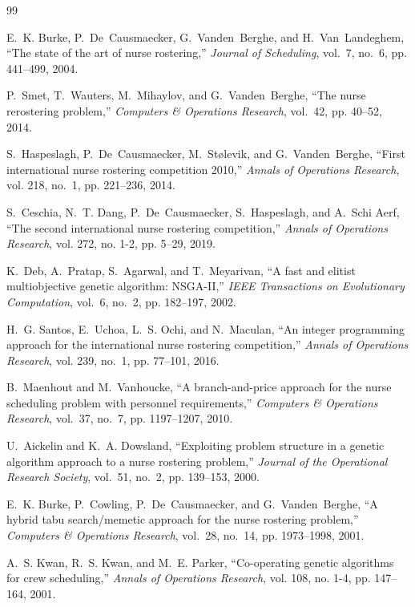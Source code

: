 \documentclass[10pt,journal,compsoc]{IEEEtran}
\begin{document}

\begin{thebibliography}{99}

E.~K. Burke, P.~De~Causmaecker, G.~Vanden~Berghe, and H.~Van~Landeghem, ``The state of the art of nurse rostering,'' \emph{Journal of Scheduling}, vol.~7, no.~6, pp. 441--499, 2004.

P.~Smet, T.~Wauters, M.~Mihaylov, and G.~Vanden~Berghe, ``The nurse rerostering problem,'' \emph{Computers \& Operations Research}, vol.~42, pp. 40--52, 2014.

S.~Haspeslagh, P.~De~Causmaecker, M.~St{\o}levik, and G.~Vanden~Berghe, ``First international nurse rostering competition 2010,'' \emph{Annals of Operations Research}, vol. 218, no.~1, pp. 221--236, 2014.

S.~Ceschia, N.~T. Dang, P.~De~Causmaecker, S.~Haspeslagh, and A.~Schi Aerf, ``The second international nurse rostering competition,'' \emph{Annals of Operations Research}, vol. 272, no. 1-2, pp. 5--29, 2019.

K.~Deb, A.~Pratap, S.~Agarwal, and T.~Meyarivan, ``A fast and elitist multiobjective genetic algorithm: NSGA-II,'' \emph{IEEE Transactions on Evolutionary Computation}, vol.~6, no.~2, pp. 182--197, 2002.

H.~G. Santos, E.~Uchoa, L.~S. Ochi, and N.~Maculan, ``An integer programming approach for the international nurse rostering competition,'' \emph{Annals of Operations Research}, vol. 239, no.~1, pp. 77--101, 2016.

B.~Maenhout and M.~Vanhoucke, ``A branch-and-price approach for the nurse scheduling problem with personnel requirements,'' \emph{Computers \& Operations Research}, vol.~37, no.~7, pp. 1197--1207, 2010.

U.~Aickelin and K.~A. Dowsland, ``Exploiting problem structure in a genetic algorithm approach to a nurse rostering problem,'' \emph{Journal of the Operational Research Society}, vol.~51, no.~2, pp. 139--153, 2000.

E.~K. Burke, P.~Cowling, P.~De~Causmaecker, and G.~Vanden~Berghe, ``A hybrid tabu search/memetic approach for the nurse rostering problem,'' \emph{Computers \& Operations Research}, vol.~28, no.~14, pp. 1973--1998, 2001.

A.~S. Kwan, R.~S. Kwan, and M.~E. Parker, ``Co-operating genetic algorithms for crew scheduling,'' \emph{Annals of Operations Research}, vol. 108, no. 1-4, pp. 147--164, 2001.


\end{thebibliography}
\end{document}
